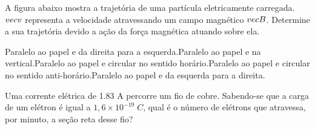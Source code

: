 \documentclass[12pt, addpoints]{exam}
\begin{document}
        \begin{questions}
\begin{multicols*}{2}
\question[20] A ﬁgura abaixo mostra a trajetória de uma partícula eletricamente carregada. $\\vec{{v}}$ representa a velocidade atravessando um campo magnético $\\vec{{B}}$. Determine a sua trajetória devido a ação da força magnética atuando sobre ela.
        
        \begin{center}
            \begin{minipage}[c]{0.5\linewidth}
            \end{minipage}
        \end{center}

        

\begin{choices}
\choice Paralelo ao papel e da direita para a esquerda.\choice Paralelo ao papel e na vertical.\choice Paralelo ao papel e circular no sentido horário.\choice Paralelo ao papel e circular no sentido anti-horário.\choice Paralelo ao papel e da esquerda para a direita.\end{choices}
\question[20] Uma corrente elétrica de    1.83 A percorre um ﬁo de cobre. Sabendo-se que a carga de um elétron é igual a $1,6\times 10^{-19}\;C$, qual é o número de elétrons que atravessa, por minuto, a seção reta desse ﬁo?


\end{multicols*}
\end{questions}
\end{document}
